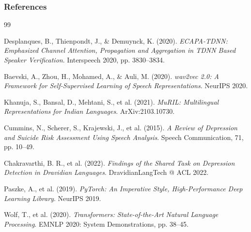 \documentclass{beamer}
\begin{document}
\begin{frame}
\frametitle{References}
\scriptsize
\begin{thebibliography}{99}

Desplanques, B., Thienpondt, J., \& Demuynck, K. (2020). 
\textit{ECAPA-TDNN: Emphasized Channel Attention, Propagation and Aggregation in TDNN Based Speaker Verification}. 
Interspeech 2020, pp. 3830--3834.

Baevski, A., Zhou, H., Mohamed, A., \& Auli, M. (2020). 
\textit{wav2vec 2.0: A Framework for Self-Supervised Learning of Speech Representations}. 
NeurIPS 2020.

Khanuja, S., Bansal, D., Mehtani, S., et al. (2021). 
\textit{MuRIL: Multilingual Representations for Indian Languages}. 
ArXiv:2103.10730.

Cummins, N., Scherer, S., Krajewski, J., et al. (2015). 
\textit{A Review of Depression and Suicide Risk Assessment Using Speech Analysis}. 
Speech Communication, 71, pp. 10--49.

Chakravarthi, B. R., et al. (2022). 
\textit{Findings of the Shared Task on Depression Detection in Dravidian Languages}. 
DravidianLangTech @ ACL 2022.

Paszke, A., et al. (2019). 
\textit{PyTorch: An Imperative Style, High-Performance Deep Learning Library}. 
NeurIPS 2019.

Wolf, T., et al. (2020). 
\textit{Transformers: State-of-the-Art Natural Language Processing}. 
EMNLP 2020: System Demonstrations, pp. 38--45.

\end{thebibliography}
\end{frame}
\end{document}
